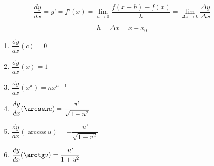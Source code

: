 \documentclass[10pt, a5paper]{article}
\begin{document}
$$
\dfrac{dy}{dx} = y\text{'} = f\text{'}(x) = \lim_{h \to 0} \dfrac{f(x + h) - f(x)}{h} =\lim_{\Delta x \to 0} \dfrac{\Delta y}{\Delta x}
$$

$$
\boxed{h = \Delta x = x - x_0}
$$

\begin{enumerate}
\item{$\dfrac{dy}{dx} (c) = 0$}
\item{$\dfrac{dy}{dx} (x) = 1$}
\item{$\dfrac{dy}{dx} (x^{n}) = nx^{n - 1}$}
\item{$\dfrac{dy}{dx} (\arcsen u) = \dfrac{u\text{'}}{\sqrt{1 - u^2}}$}
\item{$\dfrac{dy}{dx} (\arccos u) = - \dfrac{u\text{'}}{\sqrt{1 - u^2}}$}
\item{$\dfrac{dy}{dx} (\arctg u) = \dfrac{u\text{'}}{1 + u^2}$}
\end{enumerate}
\end{document}
